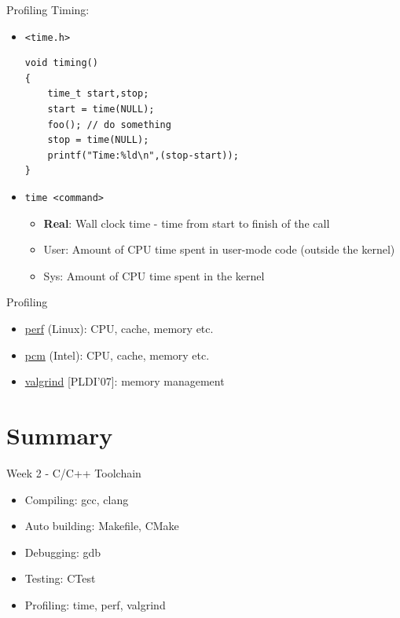 \documentclass{../TexTemplate/myslide}
\begin{document}
\begin{frame}[fragile]{Profiling}
Timing:
\begin{itemize}
\item \verb'<time.h>'
\scriptsize
\begin{verbatim}
void timing()
{
    time_t start,stop;
    start = time(NULL);
    foo(); // do something
    stop = time(NULL);
    printf("Time:%ld\n",(stop-start));
}
\end{verbatim}
\normalsize
\item \verb'time <command>'
\begin{itemize}
	\item \textbf{Real}: Wall clock time - time from start to finish of the call
	\item User: Amount of CPU time spent in user-mode code (outside the kernel)
	\item Sys: Amount of CPU time spent in the kernel
\end{itemize}
\end{itemize}
\end{frame}

\begin{frame}{Profiling}
\begin{itemize}
\item \href{http://www.brendangregg.com/perf.html}{perf} (Linux): CPU, cache, memory etc.
\item \href{https://github.com/opcm/pcm}{pcm} (Intel): CPU, cache, memory etc.
\item \href{http://www.valgrind.org/}{valgrind} [PLDI'07]: memory management
\end{itemize}
\end{frame}

\section{Summary}
\begin{frame}
\sectionpage
\end{frame}

\begin{frame}{Week 2 - C/C++ Toolchain}
\begin{itemize}
	\item Compiling: gcc, clang
	\item Auto building: Makefile, CMake
	\item Debugging: gdb
	\item Testing: CTest
	\item Profiling: time, perf, valgrind
\end{itemize}
\end{frame}
\end{document}
